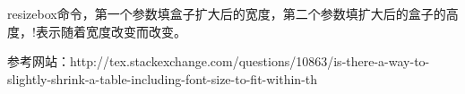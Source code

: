 \documentclass[12pt]{article}
\begin{document}
resizebox命令，第一个参数填盒子扩大后的宽度，第二个参数填扩大后的盒子的高度，!表示随着宽度改变而改变。 

参考网站：http://tex.stackexchange.com/questions/10863/is-there-a-way-to-slightly-shrink-a-table-including-font-size-to-fit-within-th

\begin{table}[h]

\centering



\end{table}
\end{document}
